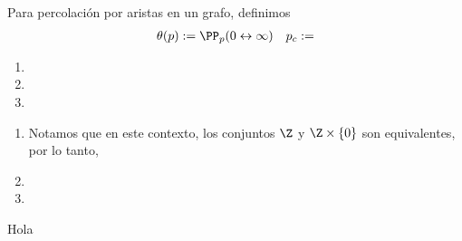 \begin{problema}{1}
Para percolación por aristas en un grafo, definimos
\begin{align*}
	\theta(p) := \PP_p(0 \leftrightarrow \infty) &&
	p_c :=
\end{align*}
	
\begin{enumerate}[label=\alph*)]
\item
\item
\item
\end{enumerate}
\end{problema}

\begin{solucion}

\begin{enumerate}[label=\alph*)]
	\item Notamos que en este contexto, los conjuntos $\Z$ y $\Z\times \{0\}$ son equivalentes, por lo tanto, 
	\item
	\item
	
\end{enumerate}

\end{solucion}

\begin{problema}{2}
	
\newpage
\end{problema}
\begin{solucion}
	Hola
\end{solucion}
